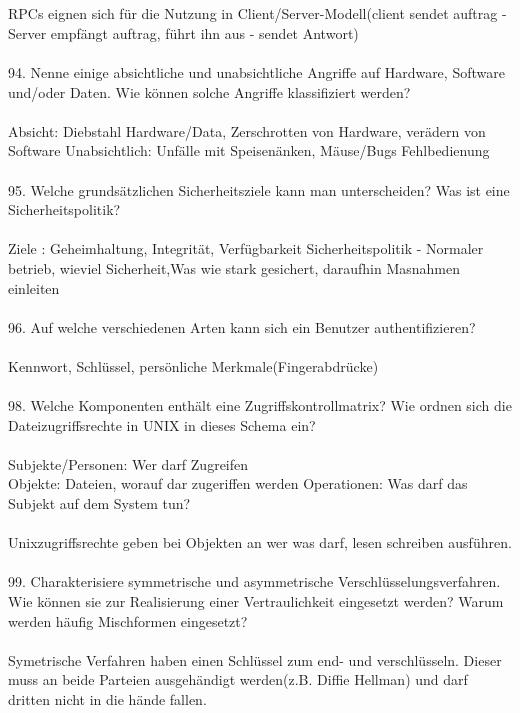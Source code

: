 \documentclass{article}
\begin{document}
\\
\\
RPCs eignen sich f\"ur die Nutzung in Client/Server-Modell(client sendet auftrag - Server empf\"angt auftrag, f\"uhrt ihn aus - sendet Antwort)
\\
\\
94. Nenne einige absichtliche und unabsichtliche Angriffe auf Hardware, Software und/oder
Daten. Wie können solche Angriffe klassifiziert werden?
\\
\\
Absicht: Diebstahl Hardware/Data, Zerschrotten von Hardware, ver\"adern von Software
Unabsichtlich: Unf\"alle mit Speisen\getr\"anken, M\"ause/Bugs Fehlbedienung
\\
\\
95. Welche grundsätzlichen Sicherheitsziele kann man unterscheiden? Was ist eine Sicherheitspolitik?
\\
\\
Ziele : Geheimhaltung, Integrit\"at, Verf\"ugbarkeit
Sicherheitspolitik - Normaler betrieb, wieviel Sicherheit,Was wie stark gesichert, daraufhin Masnahmen einleiten
\\
\\
96. Auf welche verschiedenen Arten kann sich ein Benutzer authentifizieren?
\\
\\
Kennwort, Schl\"ussel, pers\"onliche Merkmale(Fingerabdr\"ucke)
\\
\\
98. Welche Komponenten enthält eine Zugriffskontrollmatrix? Wie ordnen sich die Dateizugriffsrechte in UNIX in dieses Schema ein?
\\
\\
Subjekte/Personen: Wer darf Zugreifen\\
Objekte: Dateien, worauf dar zugeriffen werden
Operationen: Was darf das Subjekt auf dem System tun?
\\
\\
Unixzugriffsrechte geben bei Objekten an wer was darf, lesen schreiben ausf\"uhren. 
\\
\\
99. Charakterisiere symmetrische und asymmetrische Verschlüsselungsverfahren. Wie können sie
zur Realisierung einer Vertraulichkeit eingesetzt werden? Warum werden häufig Mischformen
eingesetzt?
\\
\\
Symetrische Verfahren haben einen Schl\"ussel zum end- und verschl\"usseln. Dieser muss an beide Parteien ausgeh\"andigt werden(z.B. Diffie Hellman) und darf dritten nicht in die h\"ande fallen.
\end{document}

